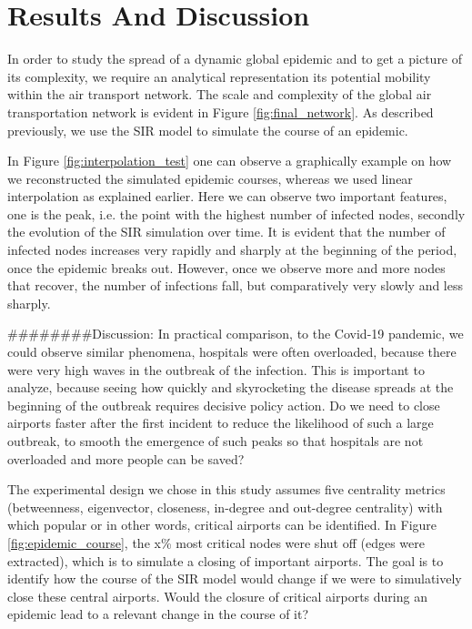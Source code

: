 \documentclass{Resources/netsci-project}
\begin{document}

\section{Results And Discussion}
In order to study the spread of a dynamic global epidemic and to get a picture of its complexity, we require an analytical representation its potential mobility within the air transport network. The scale and complexity of the global air transportation network is evident in Figure \ref{fig:final_network}. As described previously, we use the SIR model to simulate the course of an epidemic.

In Figure \ref{fig:interpolation_test} one can observe a graphically example on how we reconstructed the simulated epidemic courses, whereas we used linear interpolation as explained earlier. Here we can observe two important features, one is the peak, i.e. the point with the highest number of infected nodes, secondly the evolution of the SIR simulation over time.
It is evident that the number of infected nodes increases very rapidly and sharply at the beginning of the period, once the epidemic breaks out. However, once we observe more and more nodes that recover, the number of infections fall, but comparatively very slowly and less sharply. 

########Discussion:
In practical comparison, to the Covid-19 pandemic, we could observe similar phenomena, hospitals were often overloaded, because there were very high waves in the outbreak of the infection. This is important to analyze, because seeing how quickly and skyrocketing the disease spreads at the beginning of the outbreak requires decisive policy action. Do we need to close airports faster after the first incident to reduce the likelihood of such a large outbreak, to smooth the emergence of such peaks so that hospitals are not overloaded and more people can be saved?

The experimental design we chose in this study assumes five centrality metrics (betweenness, eigenvector, closeness, in-degree and out-degree centrality) with which popular or in other words, critical airports can be identified. 
In Figure \ref{fig:epidemic_course}, the x\% most critical nodes were shut off (edges were extracted), which is to simulate a closing of important airports. The goal is to identify how the course of the SIR model would change if we were to simulatively close these central airports. Would the closure of critical airports during an epidemic lead to a relevant change in the course of it?
\end{document}
